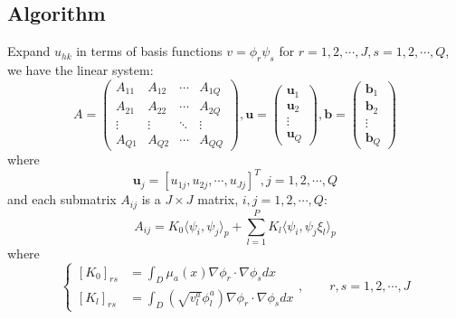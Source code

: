\subsection{Algorithm}
Expand $u_{hk}$ in terms of basis functions $v = \phi_r \psi_s$ for $r=1,2,\cdots, J, s=1,2,\cdots, Q$, we have the linear system:
\begin{equation}
    A = \begin{pmatrix}
        A_{11} & A_{12} & \cdots & A_{1Q}\\
        A_{21} & A_{22} & \cdots & A_{2Q}\\
        \vdots & \vdots & \ddots & \vdots\\
        A_{Q1} & A_{Q2} & \cdots & A_{QQ}
    \end{pmatrix},
    \mathbf{u} = \begin{pmatrix}
        \mathbf{u}_1\\
        \mathbf{u}_2\\
        \vdots\\
        \mathbf{u}_Q
    \end{pmatrix},
    \mathbf{b} = \begin{pmatrix}
        \mathbf{b}_1\\
        \mathbf{b}_2\\
        \vdots\\
        \mathbf{b}_Q
    \end{pmatrix}
\end{equation}
where
\begin{equation}
    \mathbf{u}_j = [u_{1j}, u_{2j}, \cdots, u_{Jj}]^T, j=1,2,\cdots, Q
\end{equation}
and each submatrix $A_{ij}$ is a $J\times J$ matrix, $i,j=1,2,\cdots, Q$:
\begin{equation}
    A_{ij} = K_0\langle \psi_i, \psi_j\rangle_p + \sum_{l=1}^{P}K_l\langle \psi_i, \psi_j\xi_l\rangle_p
\end{equation}
where
\begin{equation}\left\{
    \begin{aligned}
        \left[K_0\right]_{rs} &= \int_D \mu_a(x)\nabla\phi_r\cdot \nabla\phi_sdx\\
        \left[K_l\right]_{rs} &= \int_D (\sqrt{v_l^a}\phi_l^a)\nabla\phi_r\cdot \nabla\phi_sdx
    \end{aligned}\right., \qquad r,s=1,2,\cdots, J
\end{equation}


